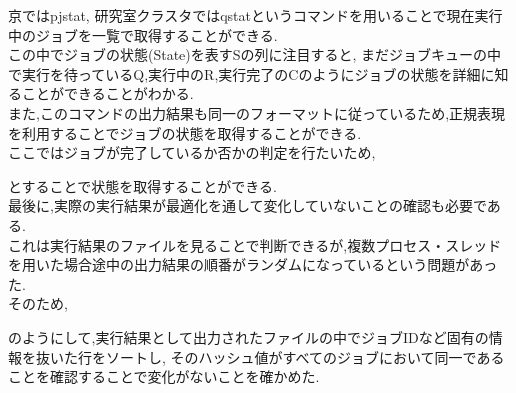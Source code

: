 京ではpjstat, 研究室クラスタではqstatというコマンドを用いることで現在実行中のジョブを一覧で取得することができる.\\
この中でジョブの状態(State)を表すSの列に注目すると, まだジョブキューの中で実行を待っているQ,実行中のR,実行完了のCのようにジョブの状態を詳細に知ることができることがわかる.\\
また,このコマンドの出力結果も同一のフォーマットに従っているため,正規表現を利用することでジョブの状態を取得することができる.\\
ここではジョブが完了しているか否かの判定を行たいため,
{\footnotesize

}
とすることで状態を取得することができる.\\

最後に,実際の実行結果が最適化を通して変化していないことの確認も必要である.\\
これは実行結果のファイルを見ることで判断できるが,複数プロセス・スレッドを用いた場合途中の出力結果の順番がランダムになっているという問題があった.\\
そのため,
{\footnotesize

}
のようにして,実行結果として出力されたファイルの中でジョブIDなど固有の情報を抜いた行をソートし,
そのハッシュ値がすべてのジョブにおいて同一であることを確認することで変化がないことを確かめた.\\
